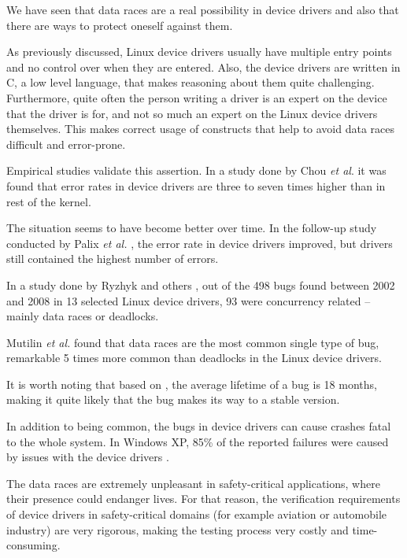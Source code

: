 \documentclass[..thesis.tex]{subfiles}
\begin{document}
We have seen that data races are a real possibility in device drivers and also that there are ways to protect oneself against them. 


As previously discussed, Linux device drivers usually have multiple entry points and no control over when they are entered. Also, the device drivers are written in C,
a low level language, that makes reasoning about them quite challenging. Furthermore, quite often the person writing a driver is an expert on the device that the driver is for,
and not so much an expert on the Linux device drivers themselves. This makes correct usage of constructs that help to avoid data races difficult and error-prone.



Empirical studies validate this assertion. In a study done by Chou \textit{et al}. \cite{chou_empirical_2001} it was found that error rates in device drivers are three to seven times higher than in rest of the kernel. 

The situation seems to have become better over time. In the follow-up study conducted by Palix \textit{et al.} \cite{palix_faults_2011}, the error rate in device drivers improved, but drivers still contained the highest number of errors.

In a study done by Ryzhyk and others \cite{ryzhyk_dingo_2009}, out of the 498 bugs found between 2002 and 2008 in 13 selected Linux device drivers, 93 were concurrency related -- mainly data races or deadlocks. 

Mutilin \textit{et al.} \cite{mutilin_analysis_2012} found that data races are the most common single type of bug, remarkable 5 times more common than deadlocks in the Linux device drivers.

It is worth noting that based on \cite{chou_empirical_2001,palix_faults_2011}, the average lifetime of a bug is 18 months, making it quite likely that the bug makes its way to a stable version. 


In addition to being common, the bugs in device drivers can cause crashes fatal to the whole system. In Windows XP, 85\% of the reported failures were caused by issues with the device drivers \cite{swift_improving_2003}.

The data races are extremely unpleasant in safety-critical applications, where their presence could endanger lives. For that reason, the verification requirements of device drivers in safety-critical domains (for example aviation or automobile industry) are very rigorous, making the testing process very costly and time-consuming.
\end{document}
